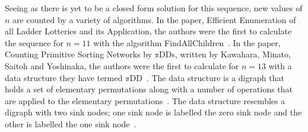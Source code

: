 Seeing as there is yet to be a closed form solution for this sequence, new values of $n$ are counted by a variety of algorithms. 
In the paper, Efficient Enumeration of all Ladder Lotteries and its Application, 
the authors were the first to calculate the sequence for $n=11$ with the algorithm {\sc FindAllChildren}~\cite{A1}. 
In the paper, Counting Primitive Sorting Networks by $\mathbb{\pi}$DDs, written by Kawahara, Minato, Saitoh and Yoshinaka, the authors
 were the first to calculate for $n=13$ with a data structure they have termed $\mathbb{\pi}$DD~\cite{A29}. 
 The data structure is a digraph that holds a 
set of elementary permutations along with a number of operations that are applied to the elementary permutations~\cite{A29}.
The data structure resembles a digraph with two sink nodes; one sink node is labelled the zero sink node and the other 
is labelled the one sink node~\cite{A29}.
\pagebreak



